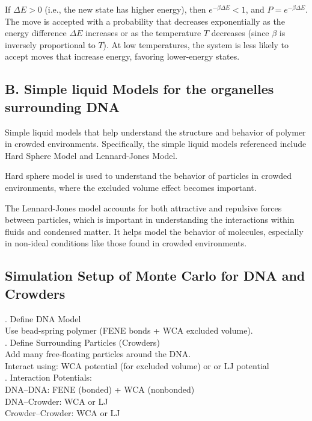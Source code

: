 \documentclass[12pt]{article}
\begin{document}
\begin{flushleft}
If $\Delta E > 0$ (i.e., the new state has higher energy), then $e^{-\beta \Delta E} < 1$, and $P = e^{-\beta \Delta E}$. The move is accepted with a probability that decreases exponentially as the energy difference $\Delta E$ increases or as the temperature $T$ decreases (since $\beta$ is inversely proportional to $T$). At low temperatures, the system is less likely to accept moves that increase energy, favoring lower-energy states.

\vspace{-1em} 
\subsection*{B. Simple liquid Models for the organelles surrounding DNA}

Simple liquid models that help understand the structure and behavior of polymer in crowded environments. Specifically, the simple liquid models referenced include Hard Sphere Model and Lennard-Jones Model. 

Hard sphere model is used to understand the behavior of particles in crowded environments, where the excluded volume effect becomes important. 

The Lennard-Jones model accounts for both attractive and repulsive forces between particles, which is important in understanding the interactions within fluids and condensed matter. It helps model the behavior of molecules, especially in non-ideal conditions like those found in crowded environments. 

\subsection*{Simulation Setup of Monte Carlo for DNA and Crowders}
. Define DNA Model\\
Use bead-spring polymer (FENE bonds + WCA excluded volume).\\
. Define Surrounding Particles (Crowders)\\
Add many free-floating particles around the DNA.\\
Interact using: WCA potential (for excluded volume) or or LJ potential\\

. Interaction Potentials:\\
DNA–DNA: FENE (bonded) + WCA (nonbonded)\\
DNA–Crowder: WCA or LJ\\
Crowder–Crowder: WCA or LJ\\




\end{flushleft}
\end{document}
